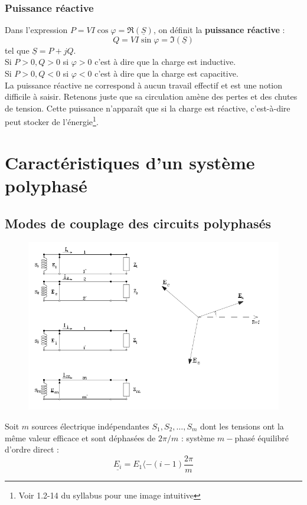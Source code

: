 \subsubsection{Puissance réactive}
Dans l'expression $P = VI \cos\varphi = \Re(\underline{S})$, on définit la 
\textbf{puissance réactive} :
\begin{equation}
	Q = VI\sin\varphi = \Im(\underline{S})
\end{equation}
tel que $\underline{S} = P+jQ$.\\
Si $P>0, Q>0$ si $\varphi>0$ c'est à dire que la charge est inductive.\\
Si $P>0, Q<0$ si $\varphi<0$ c'est à dire que la charge est capacitive.\\
			
La puissance réactive ne correspond à aucun travail effectif et est une 
notion difficile à saisir. Retenons juste que sa circulation amène des 
pertes et des chutes de tension. Cette puissance n'apparaît que si la 
charge est réactive, c'est-à-dire peut stocker de l'énergie\footnote{Voir 
1.2-14 du syllabus pour une image intuitive}.
\newpage		
\section{Caractéristiques d'un système polyphasé}
\subsection{Modes de couplage des circuits polyphasés}
\begin{figure}
	\vspace{-8mm}
	\includegraphics[scale=0.34]{ch1/image5.png}
\end{figure}	
Soit $m$ sources électrique indépendantes $S_1, S_2,\dots,S_m$ dont les tensions 
ont la même valeur efficace et sont déphasées de $2\pi/m$ : système $m-$phasé 
équilibré d'ordre direct :
\begin{equation}
	\underline{E_i} = E_{1} \langle -(i-1)\frac{2\pi}{m}
\end{equation}


